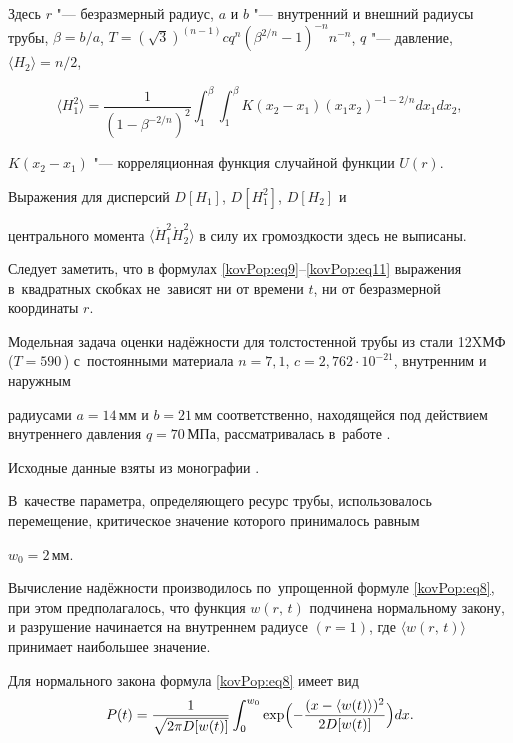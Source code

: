 Здесь $r$ "--- безразмерный радиус, $a$ и $b$ "--- внутренний и внешний радиусы трубы, $\beta={b}/{a}$,  $T={(\sqrt{3})^{(n-1)}cq^n}{(\beta^{2/n}-1)^{-n}n^{-n}}$, $q$ "--- давление, $\langle H_2\rangle={n}/{2}$,

$$

\langle H_1^2\rangle=\frac{1}{(1-\beta^{-2/n})^2}\int _{1}^{\beta}\!\!\!\int _{1}^{\beta}{K(x_2-x_1)(x_1x_2)^{-1-2/n}dx_1dx_2},

$$

$K(x_2-x_1)$ "--- корреляционная функция случайной функции $U(r)$.

Выражения для дисперсий $D[H_1]$, $D[H_1^2]$, $D[H_2]$ и

центрального момента $\langle\mathring {H}_1^2 \mathring {H}_2^2\rangle$ в силу их громоздкости здесь не выписаны.



Следует заметить, что в формулах \eqref{kovPop:eq9}--\eqref{kovPop:eq11} выражения в~квадратных скобках не~зависят ни от времени $t$, ни от безразмерной координаты $r$.







Модельная задача оценки надёжности для толстостенной трубы из стали 12XМФ ($T=590$\,\textcelsius) с~постоянными материала $n=7,1$, $c=2,762\cdot10^{-21}$, внутренним и наружным

радиусами $a=14\,\text{мм}$ и $b=21\,\text{мм}$ соответственно, находящейся под действием внутреннего давления $q=70\,\text{МПа}$, рассматривалась в~работе \cite{KovalPopov:Isutkina}. 

Исходные данные взяты из монографии \cite{KovalPopov:Radchenko}. 

В~качестве параметра, определяющего ресурс трубы, использовалось перемещение,  критическое значение которого принималось равным

$w_0=2\,\text{мм}$. 

Вычисление надёжности производилось по~упрощенной формуле \eqref{kovPop:eq8}, при этом предполагалось, что функция $w(r,\,t)$  подчинена нормальному закону, и разрушение начинается на внутреннем радиусе $(r=1)$, где $\langle w(r,\,t)\rangle$ принимает наибольшее значение. 

Для нормального закона формула \eqref{kovPop:eq8} имеет вид \begin{equation}

\label{kovPop:eq12}

P(t)=\frac{1}{\sqrt{2\pi

D[w(t)]}}\int _0^{w_0}\exp\Bigl(-\frac{(x-\langle w(t)\rangle)^2}{2D[w(t)]}\Bigr)dx.

\end{equation}

